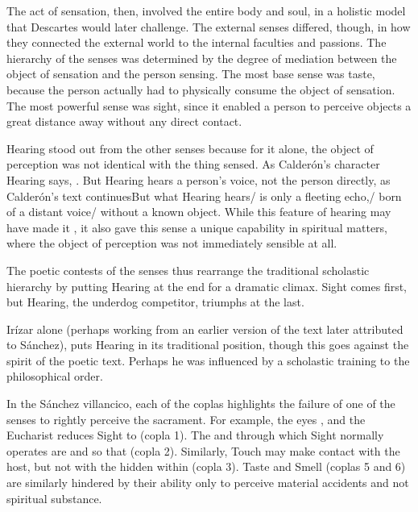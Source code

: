 The act of sensation, then, involved the entire body and soul, in a holistic
model that Descartes would later challenge.  
The external senses differed, though, in how they connected the external world
to the internal faculties and passions.
The hierarchy of the senses was determined by the degree of mediation between
the object of sensation and the person sensing.
The most base sense was taste, because the person actually had to physically
consume the object of sensation.
The most powerful sense was sight, since it enabled a person to perceive objects
a great distance away without any direct contact.

Hearing stood out from the other senses because for it alone, the object of
perception was not identical with the thing sensed.
As Calderón's character Hearing says, .%
    \Autocite[]{Calderon:Retiro}
But Hearing hears a person's voice, not the person directly, as Calderón's text
continues{But what Hearing hears/ is only a fleeting echo,/ born of a
distant voice/ without a known object}.%
    \Autocite[]{Calderon:Retiro}
While this feature of hearing may have made it , it also
gave this sense a unique capability in spiritual matters, where the object of
perception was not immediately sensible at all.

The poetic contests of the senses thus rearrange the traditional scholastic
hierarchy by putting Hearing at the end for a dramatic climax.
Sight comes first, but Hearing, the underdog competitor, triumphs at the
last.
\begin{Footnote}
    Irízar alone (perhaps working from an earlier version of the text later
    attributed to Sánchez), puts Hearing in its traditional position, though
    this goes against the spirit of the poetic text.  
    Perhaps he was influenced by a scholastic training to  the
    philosophical order.
\end{Footnote}
In the Sánchez villancico, each of the coplas highlights the failure of one of
the senses to rightly perceive the sacrament.
For example, the eyes , and the Eucharist
reduces Sight to  (copla 1).
The  and  through which Sight normally
operates are   and
 so that  (copla 2).
Similarly, Touch may make contact with the host, but not with the
 hidden within (copla 3).
Taste and Smell (coplas 5 and 6) are similarly hindered by their ability only to
perceive material accidents and not spiritual substance.

